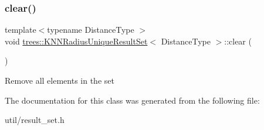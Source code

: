 \subsubsection{\texorpdfstring{clear()}{clear()}}
{\footnotesize\ttfamily template$<$typename Distance\+Type $>$ \\
void \hyperlink{classtrees_1_1_k_n_n_radius_unique_result_set}{trees\+::\+K\+N\+N\+Radius\+Unique\+Result\+Set}$<$ Distance\+Type $>$\+::clear (\begin{DoxyParamCaption}{ }\end{DoxyParamCaption})\hspace{0.3cm}{\ttfamily [inline]}}

Remove all elements in the set 

The documentation for this class was generated from the following file\+:\begin{DoxyCompactItemize}
\item 
util/result\+\_\+set.\+h\end{DoxyCompactItemize}
